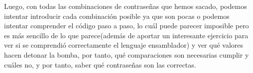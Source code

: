\documentclass[a4paper, 11pt]{article}
\begin{document}
		Luego, con todas las combinaciones de contraseñas que hemos sacado, podemos intentar introducir cada 
		combinación posible ya que son pocas o podemos intentar comprender el código paso a paso, lo cuál
		puede parecer imposible pero es más sencillo de lo que parece(además de aportar un interesante ejercicio
		para ver si se comprendió correctamente el lenguaje ensamblador) y ver qué valores hacen detonar la
		bomba, por tanto, qué comparaciones son necesarias cumplir y cuáles no, y por tanto, saber qué contraseñas
		son las correctas.
\end{document}
